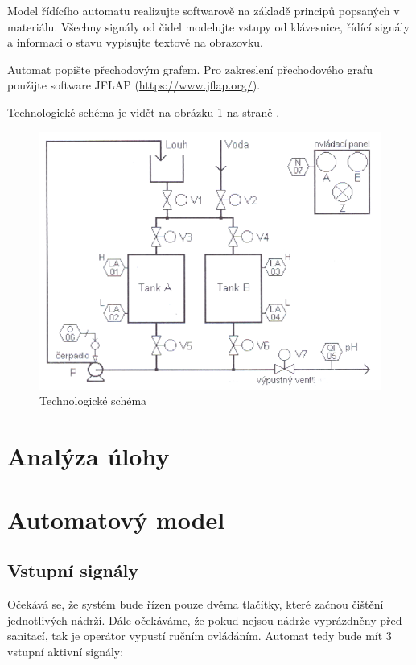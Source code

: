 \documentclass[12pt]{report}
\begin{document}
	Model řídícího automatu realizujte softwarově na základě principů popsaných v materiálu. Všechny signály od čidel modelujte vstupy od klávesnice, řídící signály a informaci o stavu vypisujte textově na obrazovku.
	
	Automat popište přechodovým grafem. Pro zakreslení přechodového grafu použijte software JFLAP (\href{https://www.jflap.org/}{https://www.jflap.org/}).
	
	Technologické schéma je vidět na obrázku \ref{fig:schema} na straně \pageref{fig:schema}.
	
	\begin{figure}
		\centering
		\includegraphics[width=0.6\textheight]{schema}
		\caption{Technologické schéma}
		\label{fig:schema}
	\end{figure}
	
	\chapter{Analýza úlohy}
	
	\chapter{Automatový model}
	
	\section{Vstupní signály}
	Očekává se, že systém bude řízen pouze dvěma tlačítky, které začnou čištění jednotlivých nádrží. Dále očekáváme, že pokud nejsou nádrže vyprázdněny před sanitací, tak je operátor vypustí ručním ovládáním. Automat tedy bude mít 3 vstupní aktivní signály: 
	
\end{document}
